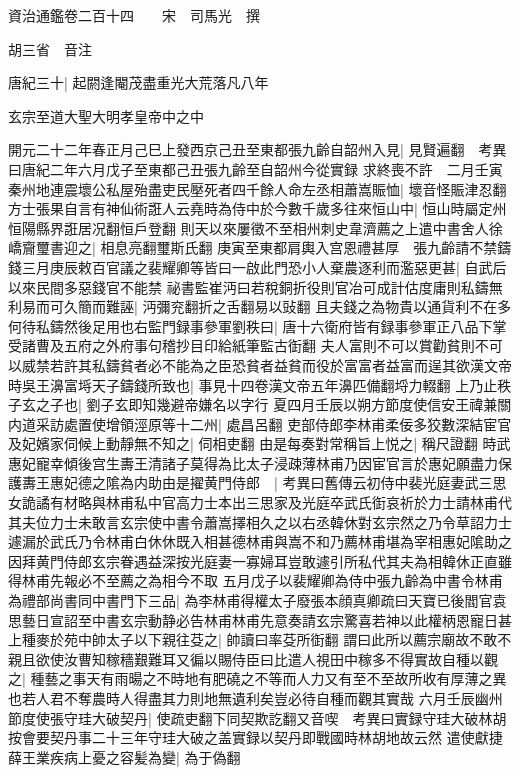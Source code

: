 資治通鑑卷二百十四　　宋　司馬光　撰

胡三省　音注

唐紀三十|{
	起閼逢閹茂盡重光大荒落凡八年}


玄宗至道大聖大明孝皇帝中之中

開元二十二年春正月己巳上發西京己丑至東都張九齡自韶州入見|{
	見賢遍翻　考異曰唐紀二年六月戊子至東都己丑張九齡至自韶州今從實録}
求終喪不許　二月壬寅秦州地連震壞公私屋殆盡吏民壓死者四千餘人命左丞相蕭嵩賑恤|{
	壞音怪賑津忍翻}
方士張果自言有神仙術誑人云堯時為侍中於今數千歲多往來恒山中|{
	恒山時屬定州恒陽縣界誑居况翻恒戶登翻}
則天以來屢徵不至相州刺史韋濟薦之上遣中書舍人徐嶠齎璽書迎之|{
	相息亮翻璽斯氏翻}
庚寅至東都肩輿入宫恩禮甚厚　張九齡請不禁鑄錢三月庚辰敕百官議之裴耀卿等皆曰一啟此門恐小人棄農逐利而濫惡更甚|{
	自武后以來民間多惡錢官不能禁}
祕書監崔沔曰若稅銅折役則官冶可成計估度庸則私鑄無利易而可久簡而難誣|{
	沔彌兖翻折之舌翻易以䜴翻}
且夫錢之為物貴以通貨利不在多何待私鑄然後足用也右監門録事參軍劉秩曰|{
	唐十六衛府皆有録事參軍正八品下掌受諸曹及五府之外府事句稽抄目印給紙筆監古衘翻}
夫人富則不可以賞勸貧則不可以威禁若許其私鑄貧者必不能為之臣恐貧者益貧而役於富富者益富而逞其欲漢文帝時吳王濞富埓天子鑄錢所致也|{
	事見十四卷漢文帝五年濞匹備翻埒力輟翻}
上乃止秩子玄之子也|{
	劉子玄即知幾避帝嫌名以字行}
夏四月壬辰以朔方節度使信安王禕兼關内道采訪處置使增領涇原等十二州|{
	處昌呂翻}
吏部侍郎李林甫柔佞多狡數深結宦官及妃嬪家伺候上動靜無不知之|{
	伺相吏翻}
由是每奏對常稱旨上悦之|{
	稱尺證翻}
時武惠妃寵幸傾後宫生夀王清諸子莫得為比太子浸疎薄林甫乃因宦官言於惠妃願盡力保護夀王惠妃德之隂為内助由是擢黄門侍郎　|{
	考異曰舊傳云初侍中裴光庭妻武三思女詭譎有材略與林甫私中官高力士本出三思家及光庭卒武氏衘哀祈於力士請林甫代其夫位力士未敢言玄宗使中書令蕭嵩擇相久之以右丞韓休對玄宗然之乃令草詔力士遽漏於武氏乃令林甫白休休既入相甚德林甫與嵩不和乃薦林甫堪為宰相惠妃隂助之因拜黄門侍郎玄宗眷遇益深按光庭妻一寡婦耳豈敢遽引所私代其夫為相韓休正直雖得林甫先報必不至薦之為相今不取}
五月戊子以裴耀卿為侍中張九齡為中書令林甫為禮部尚書同中書門下三品|{
	為李林甫得權太子廢張本顔真卿疏曰天寶已後閻官袁思藝日宣詔至中書玄宗動静必告林甫林甫先意奏請玄宗驚喜若神以此權柄恩寵日甚}
上種麥於苑中帥太子以下親往芟之|{
	帥讀曰率芟所衘翻}
謂曰此所以薦宗廟故不敢不親且欲使汝曹知稼穡艱難耳又徧以賜侍臣曰比遣人視田中稼多不得實故自種以觀之|{
	種藝之事天有雨暘之不時地有肥磽之不等而人力又有至不至故所收有厚薄之異也若人君不奪農時人得盡其力則地無遺利矣豈必待自種而觀其實哉}
六月壬辰幽州節度使張守珪大破契丹|{
	使疏吏翻下同契欺訖翻又音喫　考異曰實録守珪大破林胡按會要契丹事二十三年守珪大破之盖實録以契丹即戰國時林胡地故云然}
遣使獻捷　薛王業疾病上憂之容髪為變|{
	為于偽翻}
